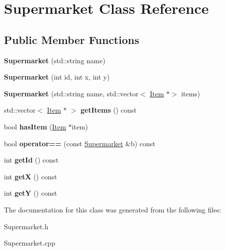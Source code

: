 \hypertarget{class_supermarket}{}\section{Supermarket Class Reference}
\label{class_supermarket}
\subsection*{Public Member Functions}
\begin{DoxyCompactItemize}
\item 
\hypertarget{class_supermarket_a2d6084aeb67422eb08a39684ffc3d1bb}{}\label{class_supermarket_a2d6084aeb67422eb08a39684ffc3d1bb} 
{\bfseries Supermarket} (std\+::string name)
\item 
\hypertarget{class_supermarket_a4371ef025bf3a2fdd52aebbdfff0eaca}{}\label{class_supermarket_a4371ef025bf3a2fdd52aebbdfff0eaca} 
{\bfseries Supermarket} (int id, int x, int y)
\item 
\hypertarget{class_supermarket_a519958f550f7729bfecefb52b8a43f6d}{}\label{class_supermarket_a519958f550f7729bfecefb52b8a43f6d} 
{\bfseries Supermarket} (std\+::string name, std\+::vector$<$ \hyperlink{class_item}{Item} $\ast$$>$ items)
\item 
\hypertarget{class_supermarket_ab514e3bbd95d2bbe9a802067bda91215}{}\label{class_supermarket_ab514e3bbd95d2bbe9a802067bda91215} 
std\+::vector$<$ \hyperlink{class_item}{Item} $\ast$ $>$ {\bfseries get\+Items} () const
\item 
\hypertarget{class_supermarket_a9d8f905f0ca15d6b80b24b4727d46f8b}{}\label{class_supermarket_a9d8f905f0ca15d6b80b24b4727d46f8b} 
bool {\bfseries has\+Item} (\hyperlink{class_item}{Item} $\ast$item)
\item 
\hypertarget{class_supermarket_aa8d30529368d3857581ef3e801b4c99a}{}\label{class_supermarket_aa8d30529368d3857581ef3e801b4c99a} 
bool {\bfseries operator==} (const \hyperlink{class_supermarket}{Supermarket} \&b) const
\item 
\hypertarget{class_supermarket_a08828c2852a67c2f630f9ed96a830a0a}{}\label{class_supermarket_a08828c2852a67c2f630f9ed96a830a0a} 
int {\bfseries get\+Id} () const
\item 
\hypertarget{class_supermarket_ace2dc66861e877a31c4328d87af15c46}{}\label{class_supermarket_ace2dc66861e877a31c4328d87af15c46} 
int {\bfseries getX} () const
\item 
\hypertarget{class_supermarket_ae8e307263578b13feb3902b8d22c2aea}{}\label{class_supermarket_ae8e307263578b13feb3902b8d22c2aea} 
int {\bfseries getY} () const
\end{DoxyCompactItemize}


The documentation for this class was generated from the following files\+:\begin{DoxyCompactItemize}
\item 
Supermarket.\+h\item 
Supermarket.\+cpp\end{DoxyCompactItemize}
